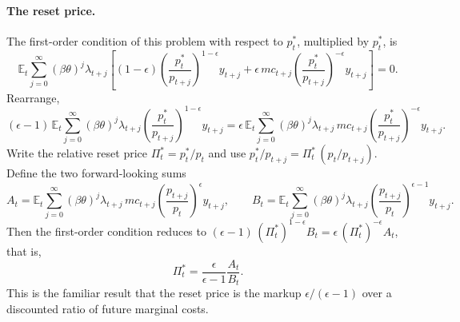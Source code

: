 \documentclass[11pt]{article}
\begin{document}
\paragraph{The reset price.} The first-order condition of this problem with respect to $p_t^{*}$, multiplied by $p_t^{*}$, is
\begin{equation*}
\mathbb{E}_t \sum_{j=0}^{\infty} (\beta\theta)^{j} \lambda_{t+j} \left[ (1-\epsilon) \left( \frac{p_t^{*}}{p_{t+j}} \right)^{1-\epsilon} y_{t+j} + \epsilon\, mc_{t+j} \left( \frac{p_t^{*}}{p_{t+j}} \right)^{-\epsilon} y_{t+j} \right] = 0 .
\end{equation*}
Rearrange,
\begin{equation*}
(\epsilon-1)\, \mathbb{E}_t \sum_{j=0}^{\infty} (\beta\theta)^{j} \lambda_{t+j} \left( \frac{p_t^{*}}{p_{t+j}} \right)^{1-\epsilon} y_{t+j}
= \epsilon\, \mathbb{E}_t \sum_{j=0}^{\infty} (\beta\theta)^{j} \lambda_{t+j}\, mc_{t+j} \left( \frac{p_t^{*}}{p_{t+j}} \right)^{-\epsilon} y_{t+j} .
\end{equation*}
Write the relative reset price $\Pi_t^{*} = p_t^{*}/p_t$ and use $p_t^{*}/p_{t+j} = \Pi_t^{*}\, (p_t/p_{t+j})$. Define the two forward-looking sums
\begin{equation*}
A_t = \mathbb{E}_t \sum_{j=0}^{\infty} (\beta\theta)^{j} \lambda_{t+j}\, mc_{t+j} \left( \frac{p_{t+j}}{p_t} \right)^{\epsilon} y_{t+j},
\qquad
B_t = \mathbb{E}_t \sum_{j=0}^{\infty} (\beta\theta)^{j} \lambda_{t+j} \left( \frac{p_{t+j}}{p_t} \right)^{\epsilon-1} y_{t+j} .
\end{equation*}
Then the first-order condition reduces to $(\epsilon-1)\, (\Pi_t^{*})^{1-\epsilon} B_t = \epsilon\, (\Pi_t^{*})^{-\epsilon} A_t$, that is,
\begin{equation*}
\Pi_t^{*} = \frac{\epsilon}{\epsilon-1} \frac{A_t}{B_t} .
\end{equation*}
This is the familiar result that the reset price is the markup $\epsilon/(\epsilon-1)$ over a discounted ratio of future marginal costs.
\end{document}
